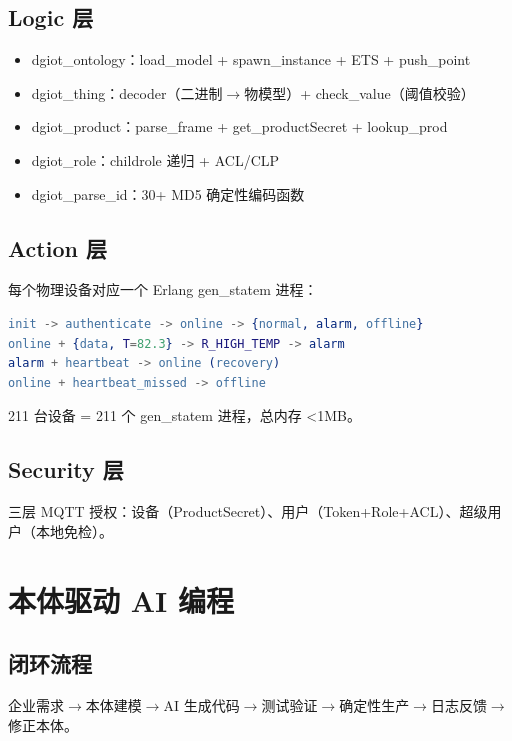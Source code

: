 \documentclass[12pt,a4paper]{ctexart}
\begin{document}
\subsection{Logic 层}

\begin{itemize}[leftmargin=*]
  \item dgiot\_ontology：load\_model + spawn\_instance + ETS + push\_point
  \item dgiot\_thing：decoder（二进制$\rightarrow$物模型）+ check\_value（阈值校验）
  \item dgiot\_product：parse\_frame + get\_productSecret + lookup\_prod
  \item dgiot\_role：childrole 递归 + ACL/CLP
  \item dgiot\_parse\_id：30+ MD5 确定性编码函数
\end{itemize}

\subsection{Action 层}

每个物理设备对应一个 Erlang gen\_statem 进程：

\begin{lstlisting}[language=erlang]
init -> authenticate -> online -> {normal, alarm, offline}
online + {data, T=82.3} -> R_HIGH_TEMP -> alarm
alarm + heartbeat -> online (recovery)
online + heartbeat_missed -> offline
\end{lstlisting}

211 台设备 = 211 个 gen\_statem 进程，总内存 <1MB。

\subsection{Security 层}

三层 MQTT 授权：设备（ProductSecret）、用户（Token+Role+ACL）、超级用户（本地免检）。

\section{本体驱动 AI 编程}

\subsection{闭环流程}

企业需求$\rightarrow$本体建模$\rightarrow$AI 生成代码$\rightarrow$测试验证$\rightarrow$确定性生产$\rightarrow$日志反馈$\rightarrow$修正本体。
\end{document}

